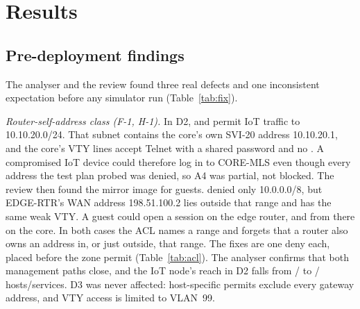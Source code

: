 \section{Results}
\label{sec:results}

\ifmeasured\else
\noindent{}
\par\medskip
\fi

\subsection{Pre-deployment findings}
\label{sec:res-verify}
\ifhavefix
The analyser and the review found three real defects and one inconsistent expectation before any simulator run (Table~\ref{tab:fix}).

\emph{Router-self-address class (F-1, H-1).} In D2,  and  permit IoT traffic to 10.10.20.0/24. That subnet contains the core's own SVI-20 address 10.10.20.1, and the core's VTY lines accept Telnet with a shared password and no . A compromised IoT device could therefore log in to CORE-MLS even though every address the test plan probed was denied, so A4 was partial, not blocked. The review then found the mirror image for guests.  denied only 10.0.0.0/8, but EDGE-RTR's WAN address 198.51.100.2 lies outside that range and has the same weak VTY. A guest could open a session on the edge router, and from there on the core. In both cases the ACL names a range and forgets that a router also owns an address in, or just outside, that range. The fixes are one deny each, placed before the zone permit (Table~\ref{tab:acl}). The analyser confirms that both management paths close, and the IoT node's reach in D2 falls from \fixHostsDtwoPre{}/\fixSvcDtwoPre{} to \fixHostsDtwoPost{}/\fixSvcDtwoPost{} hosts/services. D3 was never affected: host-specific permits exclude every gateway address, and VTY access is limited to VLAN~99.

